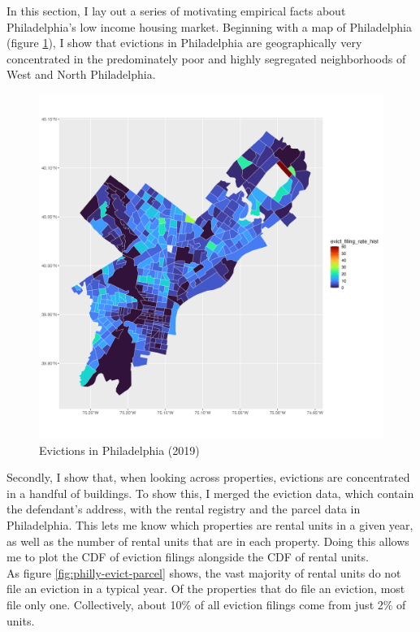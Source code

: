 \documentclass{article}
\begin{document}
In this section, I lay out a series of motivating empirical facts about Philadelphia's low income housing market. Beginning with a map of Philadelphia (figure \ref{fig:philly-map}), I show that evictions in Philadelphia are geographically very concentrated in the predominately poor and highly segregated neighborhoods of West and North Philadelphia.


\begin{figure}[htbp]
    \centering
    \includegraphics[width=1\linewidth]{figs/evict_filing_rate_hist.png}
    \caption{Evictions in Philadelphia (2019)}
    \label{fig:philly-map}
\end{figure}

Secondly, I show that, when looking across properties, evictions are concentrated in a handful of buildings. To show this, I merged the eviction data, which contain the defendant's address, with the rental registry and the parcel data in Philadelphia. This lets me know which properties are rental units in a given year, as well as the number of rental units that are in each property. Doing this allows me to plot the CDF of eviction filings alongside the CDF of rental units. \\

As figure \ref{fig:philly-evict-parcel} shows, the vast majority of rental units do not file an eviction in a typical year. Of the properties that do file an eviction, most file only one. Collectively, about 10\% of all eviction filings come from just 2\% of units. \\
\end{document}
